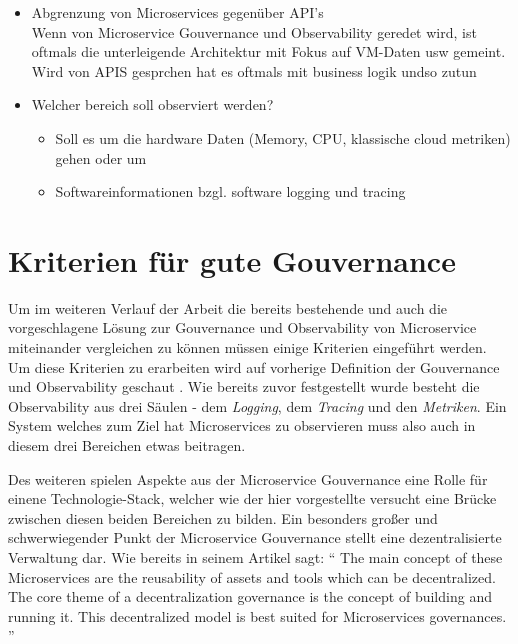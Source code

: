 \documentclass[
	12pt,
	BCOR=5mm,
	DIV=12,
	headinclude=on,
	footinclude=off,
	parskip=half,
	bibliography=totoc,
	listof=entryprefix,
	toc=listof,
	numbers=noenddot,
	plainfootsepline
]{scrreprt}
\begin{document}
\begin{itemize}
	\item Abgrenzung von Microservices gegenüber API's \\
	Wenn von Microservice Gouvernance und Observability geredet wird, ist oftmals die unterleigende Architektur mit Fokus auf VM-Daten usw gemeint. Wird von APIS gesprchen hat es oftmals mit business logik undso zutun
\end{itemize}
\begin{itemize}
	\item Welcher bereich soll observiert werden?
	\begin{itemize}
		\item Soll es um die hardware Daten (Memory, CPU, klassische cloud metriken) gehen oder um
		\item Softwareinformationen bzgl. software logging und tracing
	\end{itemize}
\end{itemize}
\section{Kriterien für gute Gouvernance}

Um im weiteren Verlauf der Arbeit die bereits bestehende und auch die vorgeschlagene Lösung zur Gouvernance und Observability von Microservice miteinander vergleichen zu können müssen einige Kriterien eingeführt werden. Um diese Kriterien zu erarbeiten wird auf vorherige Definition der Gouvernance und Observability geschaut . Wie bereits zuvor festgestellt wurde besteht die Observability aus drei Säulen - dem \textit{Logging}, dem \textit{Tracing} und den \textit{Metriken}. Ein System welches zum Ziel hat Microservices zu observieren muss also auch in diesem drei Bereichen etwas beitragen. 

Des weiteren spielen Aspekte aus der Microservice Gouvernance eine Rolle für einene Technologie-Stack, welcher wie der hier vorgestellte versucht eine Brücke zwischen diesen beiden Bereichen zu bilden. Ein besonders großer und schwerwiegender Punkt der Microservice Gouvernance stellt eine dezentralisierte Verwaltung dar. Wie bereits \citeauthor{LeanixGouv} in seinem Artikel sagt:
\enquote{
	The main concept of these Microservices are the reusability of assets and tools which can be decentralized. The core theme of a decentralization governance is the concept of building and running it. This decentralized model is best suited for Microservices governances.
}\autocite{LeanixGouv}
\end{document}
